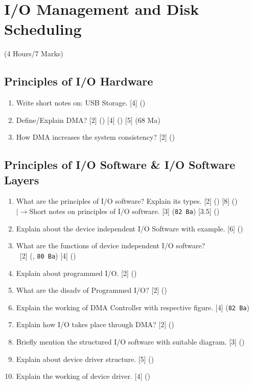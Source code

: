 \documentclass[12pt]{article}
\newcommand{\lb}{\\$\left|\rightarrow\right.$}
\newcommand{\enter}{\\\textcolor{white}{1}}
\begin{document}
	\pagebreak

\section{I/O Management and Disk Scheduling}
	\begin{center}(4 Hours/7 Marks)\end{center}
	\subsection{Principles of I/O Hardware}
		\begin{enumerate}[noitemsep, topsep=0pt]
			\item Write short notes on: USB Storage. \hfill [4] ()
			
			\item Define/Explain DMA? \hfill [2] () [4] () [5] (68 Ma)

			\item How DMA increases the system consistency? \hfill [2] ()
		\end{enumerate}

	\subsection{Principles of I/O Software \& I/O Software Layers}
		\begin{enumerate}[noitemsep, topsep=0pt]
			\item What are the principles of I/O software? Explain its types. \hfill [2] () [8] ()
			\lb Short notes on principles of I/O software. \hfill [3] (\texttt{82 Ba}) [3.5] ()

			\item Explain about the device independent I/O Software with example. \hfill [6] ()

			\item What are the functions of device independent I/O software?
			\enter\hfill [2] (, \texttt{80 Ba}) [4] ()

			\item Explain about programmed I/O. \hfill [2] ()

			\item What are the disadv of Programmed I/O? \hfill [2] ()
			
			\item Explain the working of DMA Controller with respective figure. \hfill [4] (\texttt{82 Ba})

			\item Explain how I/O takes place through DMA? \hfill [2] ()

			\item Briefly mention the structured I/O software with suitable diagram. \hfill [3] ()

			\item Explain about device driver structure. \hfill [5] ()

			\item Explain the working of device driver. \hfill [4] ()
		\end{enumerate}
		
\end{document}
